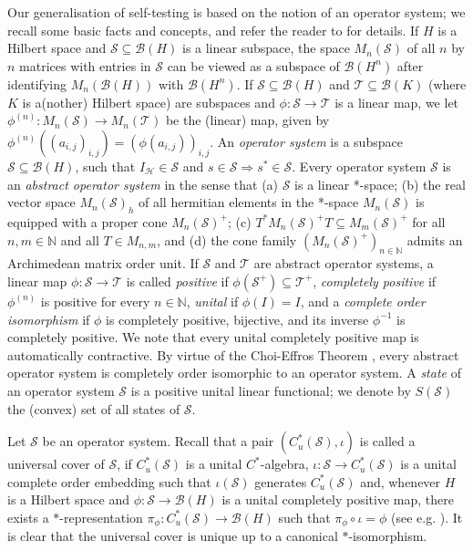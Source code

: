 \documentclass[11pt]{amsart}
\theoremstyle{definition}
\newcommand{\cl}[1]{\mathcal{#1}}
\newcommand{\bb}[1]{\mathbb{#1}}
\begin{document}
Our generalisation of self-testing is based on the 
notion of an operator system; 
we recall some basic facts and concepts, and refer the 
reader to \cite{Pa} for details. 
If $H$ is a Hilbert space and 
$\cl S\subseteq\cl B(H)$ is a linear subspace, 
the space $M_n(\cl S)$ of all $n$ by $n$ matrices with entries in $\cl S$ 
can be viewed as a subspace of $\cl B(H^n)$ 
after identifying $M_n(\cl B(H))$ with $\cl B(H^n)$. 
If $\cl S \subseteq \cl B(H)$ and $\cl T \subseteq \cl B(K)$ 
(where $K$ is a(nother) Hilbert space) are subspaces and 
$\phi : \cl S\to \cl T$ is a linear map, 
we let $\phi^{(n)} : M_n(\cl S)\to M_n(\cl T)$ be the (linear) map, given by 
$\phi^{(n)}((a_{i,j})_{i,j}) = (\phi(a_{i,j}))_{i,j}$.
An \textit{operator system} is a subspace 
$\cl S \subseteq \cl B(H)$,
such that $I_{\cl H}\in \cl S$ and $s\in \cl S \Rightarrow s^*\in \cl S$. 
Every operator system $\cl S$ is an {\it abstract operator system} in the sense that 
(a) $\cl S$ is a linear *-space; (b) the real vector 
space $M_n(\cl S)_h$ of all hermitian elements in the 
*-space $M_n(\cl S)$
is equipped with a proper cone $M_n(\cl S)^+$;
(c) 
$T^* M_n(\cl S)^+ T\subseteq M_m(\cl S)^+$ for all $n,m\in\bb{N}$ and all $T\in M_{n,m}$, and 
(d) the cone family $(M_n(\cl S)^+)_{n\in \bb{N}}$ 
admits an Archimedean matrix order unit. 
If $\cl S$ and $\cl T$ are abstract operator systems, 
a linear map $\phi : \cl S\to \cl T$
is called \textit{positive} if $\phi (\cl S^+)\subseteq \cl T^+$,
\textit{completely positive} if $\phi^{(n)}$ is positive for every $n\in \bb{N}$, 
\textit{unital} if $\phi(I) = I$,
and a \textit{complete order isomorphism} if $\phi$ is completely positive, bijective, and 
its inverse $\phi^{-1}$ is completely positive. 
We note that every unital completely positive map is 
automatically contractive. 
By virtue of the Choi-Effros Theorem \cite[Theorem 13.1]{Pa}, 
every abstract operator system is completely order isomorphic to an
operator system. 
A \textit{state} of an operator system 
$\cl S$ is a positive unital linear functional; 
we denote by $S(\cl S)$ the (convex) set of all states of $\cl S$. 

Let $\cl S$ be an operator system. Recall that 
a pair $(C_u^*(\cl S), \iota)$ is called a universal cover of $\cl S$, if $C_u^*(\cl S)$ is a unital $C^*$-algebra, $\iota:\cl S\to C_u^*(\cl S)$ is a unital complete order embedding
such that $\iota(\cl S)$ generates $C_u^*(\cl S)$
and, whenever $H$ is a Hilbert space and $\phi:\cl S\to\cl B(H)$ is a unital completely positive map, there exists a $*$-representation $\pi_\phi:C_u^*(\cl S)\to \cl B(H)$ such that $\pi_\phi\circ\iota=\phi$
(see e.g. \cite{KPTT11}). It is clear that
the universal cover is unique up to a canonical $*$-isomorphism.
\end{document}
